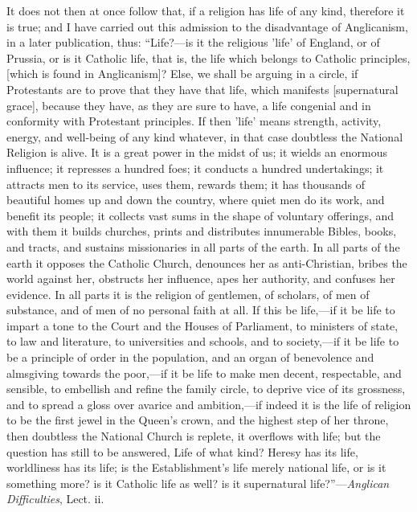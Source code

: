It does not then at once follow that, if a
religion has life of any kind, therefore it is true; and I have
carried out this admission to the disadvantage of Anglicanism, in a
later publication, thus: ``Life?—is it the religious 'life' of
England, or of Prussia, or is it Catholic life, that is, the life
which belongs to Catholic principles, [which is found in Anglicanism]?
Else, we shall be arguing in a circle, if Protestants are to prove
that they have that life, which manifests [supernatural grace],
because they have, as they are sure to have, a life congenial and in
conformity with Protestant principles. If then 'life' means strength,
activity, energy, and well-being of any kind whatever, in that case
doubtless the National Religion is alive. It is a great power in the
midst of us; it wields an enormous influence; it represses a hundred
foes; it conducts a hundred undertakings; it attracts men to its
service, uses them, rewards them; it has thousands of beautiful homes
up and down the country, where quiet men do its work, and benefit its
people; it collects vast sums in the shape of voluntary offerings, and
with them it builds churches, prints and distributes innumerable
Bibles, books, and tracts, and sustains missionaries in all parts of
the earth. In all parts of the earth it opposes the Catholic Church,
denounces her as anti-Christian, bribes the world against her,
obstructs her influence, apes her authority, and confuses her
evidence. In all parts it is the religion of gentlemen, of scholars,
of men of substance, and of men of no personal faith at all. If this
be life,—if it be life to impart a tone to the Court and the
Houses of Parliament, to ministers of state, to law and literature, to
universities and schools, and to society,—if it be life to be a
principle of order in the population, and an organ of benevolence and
almsgiving towards the poor,—if it be life to make men decent,
respectable, and sensible, to embellish and refine the family circle,
to deprive vice of its grossness, and to spread a gloss over avarice
and ambition,—if indeed it is the life of religion to be the first
jewel in the Queen's crown, and the highest step of her throne, then
doubtless the National Church is replete, it overflows with life; but
the question has still to be answered, Life of what kind? Heresy has
its life, worldliness has its life; is the Establishment's life merely
national life, or is it something more? is it Catholic life as well?
is it supernatural life?''—\emph{Anglican Difficulties}, Lect.
ii.

